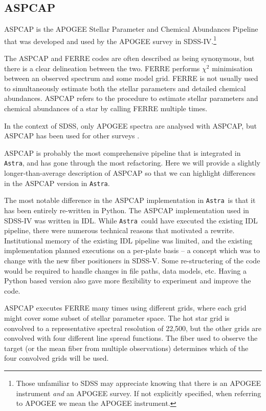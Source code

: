 \documentclass[modern]{aastex631}
\newcommand{\astra}{\texttt{Astra}}
\newcommand{\Astra}{\astra}
\begin{document}
\subsection{ASPCAP} \label{sec:methods-aspcap}

ASPCAP is the APOGEE Stellar Parameter and Chemical Abundances Pipeline \citep{aspcap} that was developed and used by the APOGEE survey in SDSS-IV.\footnote{Those unfamiliar to SDSS may appreciate knowing that there is an APOGEE instrument \emph{and} an APOGEE survey. If not explicitly specified, when referring to APOGEE we mean the APOGEE instrument.}


The ASPCAP and FERRE codes are often described as being synonymous, but there is a clear delineation between the two. FERRE \citep[and Section \ref{sec:methods-ferre}][]{ferre} performs $\chi^2$ minimisation between an observed spectrum and some model grid. FERRE is not usually used to simultaneously estimate both the stellar parameters and detailed chemical abundances. ASPCAP refers to the procedure to estimate stellar parameters and chemical abundances of a star by calling FERRE multiple times.

In the context of SDSS, only APOGEE spectra are analysed with ASPCAP, but ASPCAP has been used for other surveys \citep{who}. 


ASPCAP is probably the most comprehensive pipeline that is integrated in \Astra, and has gone through the most refactoring. Here we will provide a slightly longer-than-average description of ASPCAP so that we can highlight differences in the ASPCAP version in \Astra.

The most notable difference in the ASPCAP implementation in \Astra\ is that it has been entirely re-written in Python. The ASPCAP implementation used in SDSS-IV was written in IDL. While \Astra\ could have executed the existing IDL pipeline, there were numerous technical reasons that motivated a rewrite. Institutional memory of the existing IDL pipeline was limited, and the existing implementation planned executions on a per-plate basis -- a concept which was to change with the new fiber positioners in SDSS-V. Some re-structering of the code would be required to handle changes in file paths, data models, etc. Having a Python based version also gave more flexibility to experiment and improve the code. 


ASPCAP executes FERRE many times using different grids, where each grid might cover some subset of stellar parameter space. The hot star grid is convolved to a representative spectral resolution of 22,500, but the other grids are convolved with four different line spread functions. The fiber used to observe the target (or the mean fiber from multiple observations) determines which of the four convolved grids will be used.
\end{document}
